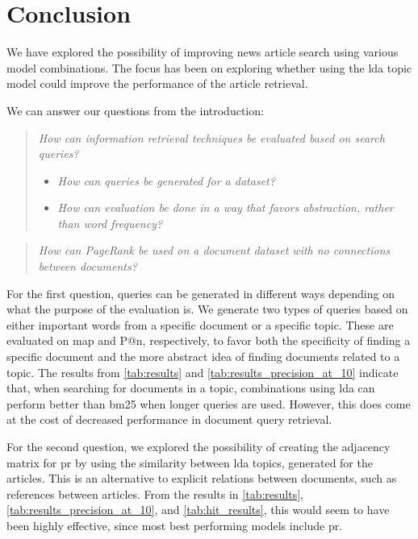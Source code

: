 \section{Conclusion}\label{sec:conclusion}
We have explored the possibility of improving news article search using various model combinations.
The focus has been on exploring whether using the \gls{lda} topic model could improve the performance of the article retrieval.

We can answer our questions from the introduction:
\begin{quote}
	\emph{How can information retrieval techniques be evaluated based on search queries?}
	\begin{itemize}
		\item \emph{How can queries be generated for a dataset?}
		\item \emph{How can evaluation be done in a way that favors abstraction, rather than word frequency?}
	\end{itemize}
\end{quote}
\vspace{0.1 cm}

\begin{quote}
	\emph{How can PageRank be used on a document dataset with no connections between documents?}
\end{quote}

For the first question, queries can be generated in different ways depending on what the purpose of the evaluation is.
We generate two types of queries based on either important words from a specific document or a specific topic.
These are evaluated on \acrlong{map} and P@n, respectively, to favor both the specificity of finding a specific document and the more abstract idea of finding documents related to a topic.
The results from \autoref{tab:results} and \autoref{tab:results_precision_at_10} indicate that, when searching for documents in a topic, combinations using \gls{lda} can perform better than \gls{bm25} when longer queries are used.
However, this does come at the cost of decreased performance in document query retrieval.

For the second question, we explored the possibility of creating the adjacency matrix for \gls{pr} by using the similarity between \gls{lda} topics, generated for the articles.
This is an alternative to explicit relations between documents, such as references between articles.
From the results in \autoref{tab:results}, \autoref{tab:results_precision_at_10}, and \autoref{tab:hit_results}, this would seem to have been highly effective, since most best performing models include \gls{pr}.
